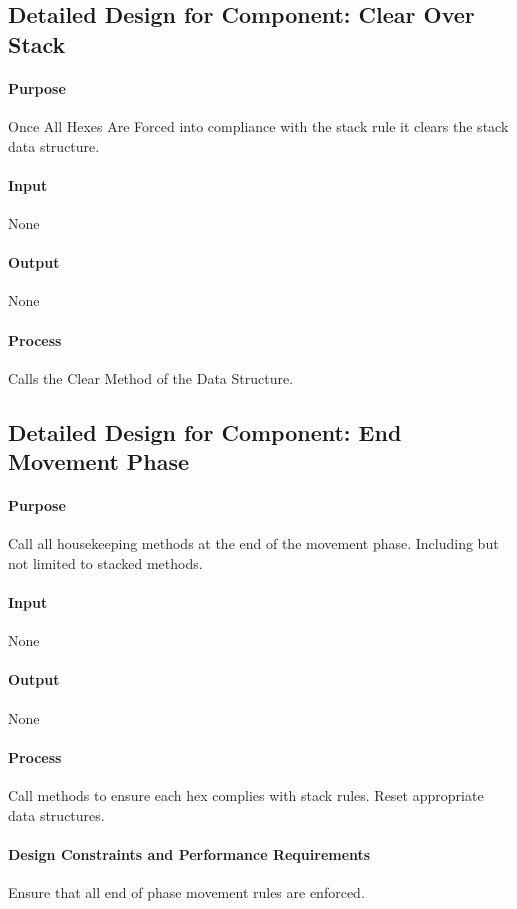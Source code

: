 \documentclass[12pt,a4paper,titlepage]{article}
\begin{document}
\subsection{Detailed Design for Component: Clear Over Stack}
\paragraph{Purpose} Once All Hexes Are Forced into compliance with the stack rule it clears the stack data structure.
\paragraph{Input} None
\paragraph{Output} None
\paragraph{Process} Calls the Clear Method of the Data Structure.

\subsection{Detailed Design for Component: End Movement Phase}
\paragraph{Purpose} Call all housekeeping methods at the end of the movement phase.  Including but not limited to stacked methods.
\paragraph{Input} None
\paragraph{Output} None
\paragraph{Process} Call methods to ensure each hex complies with stack rules. Reset appropriate data structures.
\paragraph{Design Constraints and Performance Requirements} Ensure that all end of phase movement rules are enforced.
\end{document}
